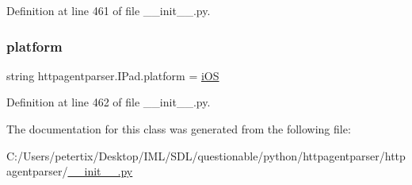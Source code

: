 Definition at line 461 of file \+\_\+\+\_\+init\+\_\+\+\_\+.\+py.

\hypertarget{classhttpagentparser_1_1_i_pad_a900ab262d2c0ba7bf95925ecf94dd454}{}\label{classhttpagentparser_1_1_i_pad_a900ab262d2c0ba7bf95925ecf94dd454} 
\subsubsection{\texorpdfstring{platform}{platform}}
{\footnotesize\ttfamily string httpagentparser.\+I\+Pad.\+platform = \textquotesingle{}\hyperlink{classhttpagentparser_1_1i_o_s}{i\+OS}\textquotesingle{}\hspace{0.3cm}{\ttfamily [static]}}



Definition at line 462 of file \+\_\+\+\_\+init\+\_\+\+\_\+.\+py.



The documentation for this class was generated from the following file\+:\begin{DoxyCompactItemize}
\item 
C\+:/\+Users/petertix/\+Desktop/\+I\+M\+L/\+S\+D\+L/questionable/python/httpagentparser/httpagentparser/\hyperlink{____init_____8py}{\+\_\+\+\_\+init\+\_\+\+\_\+.\+py}\end{DoxyCompactItemize}
